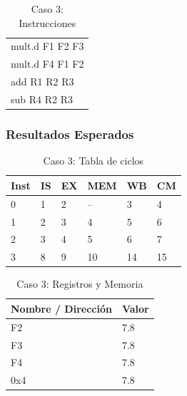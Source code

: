 \documentclass[a4paper]{article}
\begin{document}
	\begin{table}[H]
		\centering
		\caption*{Caso 3: Instrucciones}
		\begin{tabular}{l}
		mult.d F1 F2 F3 \\
		mult.d F4 F1 F2 \\
		add R1 R2 R3 \\
		sub R4 R2 R3
		\end{tabular}
	\end{table}

	\subsubsection*{Resultados Esperados}

	\begin{table}[H]
		\centering
		\caption*{Caso 3: Tabla de ciclos}
		\begin{tabular}{|l|l|l|l|l|l|}
			\hline
			\textbf{Inst} & \textbf{IS} & \textbf{EX} & \textbf{MEM} & \textbf{WB} & \textbf{CM} \\ \hline
			0             & 1           & 2           & --           & 3           & 4           \\ \hline
			1             & 2           & 3           & 4            & 5           & 6           \\ \hline
			2             & 3           & 4           & 5            & 6           & 7           \\ \hline
			3             & 8           & 9           & 10           & 14          & 15          \\ \hline
			\end{tabular}
	\end{table}

	\begin{table}[H]
		\centering
		\caption*{Caso 3: Registros y Memoria}
		\begin{tabular}{|l|l|}
			\hline
			\textbf{Nombre / Dirección} & \textbf{Valor} \\ \hline
			F2                          & 7.8            \\ \hline
			F3                          & 7.8            \\ \hline
			F4                          & 7.8            \\ \hline
			0x4                         & 7.8            \\ \hline
		\end{tabular}
	\end{table}
\end{document}
